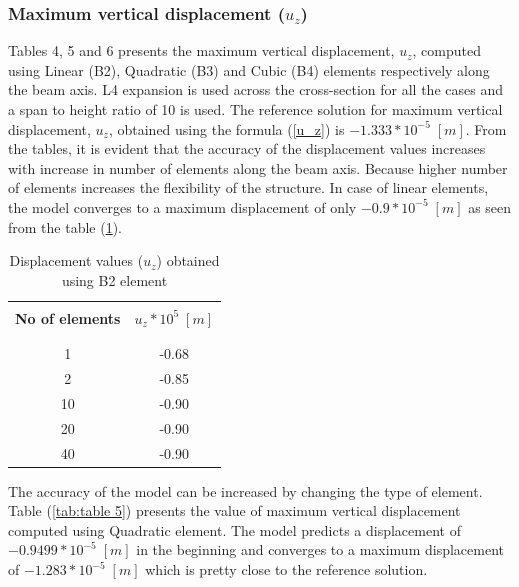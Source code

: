 \documentclass[a4paper,12pt]{article}
\begin{document}
\subsubsection*{Maximum vertical displacement ($u_{z}$)}
Tables 4, 5 and 6 presents the maximum vertical displacement, $u_{z}$, computed using Linear (B2), Quadratic (B3) and Cubic (B4) elements respectively along the beam axis. L4 expansion is used across the cross-section for all the cases and a span to height ratio of 10 is used. The reference solution for maximum vertical displacement, $u_{z}$, obtained using the formula (\ref{u_z}) is $-1.333*10^{-5}\;[m]$. From the tables, it is evident that the accuracy of the displacement values increases with increase in number of elements along the beam axis. Because higher number of elements increases the flexibility of the structure. In case of linear elements, the model converges to a maximum displacement of only $-0.9*10^{-5}\;[m]$ as seen from the table (\ref{tab:table 4}).
\begin{table}[h!]
  \begin{center}
     \begin{tabular}{c c}
      \hline\\
      \textbf{No of elements} & \textbf{$u_{z}*10^{5}\;[m]$} \\
      \\
      \hline
      \\[-2pt]
       1 & -0.68 \\[5pt]
       2 & -0.85 \\[5pt]
      10 & -0.90 \\[5pt]
      20 & -0.90 \\[5pt]
      40 & -0.90 \\[5pt]

      \hline
     \end{tabular}
    \caption{Displacement values ($u_{z}$) obtained using B2 element}
    \label{tab:table 4}
  \end{center}
\end{table}
\newpage
The accuracy of the model can be increased by changing the type of element. Table (\ref{tab:table 5}) presents the value of maximum vertical displacement computed using Quadratic element. The model predicts a displacement of $-0.9499*10^{-5}\;[m]$ in the beginning and converges to a maximum displacement of $-1.283*10^{-5}\;[m]$ which is pretty close to the reference solution.
\end{document}
